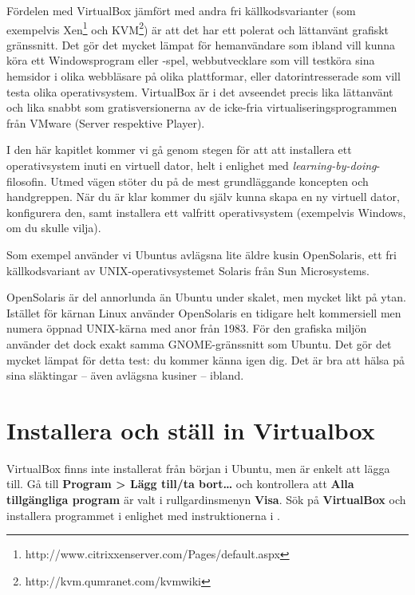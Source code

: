 \documentclass[a4paper,final]{memoir} %
\begin{document}
Fördelen med VirtualBox jämfört med andra fri källkodsvarianter (som exempelvis Xen\footnote{http://www.citrixxenserver.com/Pages/default.aspx} och KVM\footnote{http://kvm.qumranet.com/kvmwiki}) är att det har ett polerat och lättanvänt grafiskt gränssnitt. Det gör det mycket lämpat för hemanvändare som ibland vill kunna köra ett Windowsprogram eller -spel, webbutvecklare som vill testköra sina hemsidor i olika webbläsare på olika plattformar, eller datorintresserade som vill testa olika operativsystem. VirtualBox är i det avseendet precis lika lättanvänt och lika snabbt som gratisversionerna av de icke-fria virtualiseringsprogrammen från VMware (Server respektive Player). 

I den här kapitlet kommer vi gå genom stegen för att att installera ett operativsystem inuti en virtuell dator, helt i enlighet med \textit{learning-by-doing}-filosofin. Utmed vägen stöter du på de mest grundläggande koncepten och handgreppen. När du är klar kommer du själv kunna skapa en ny virtuell dator, konfigurera den, samt installera ett valfritt operativsystem (exempelvis Windows, om du skulle vilja). 

Som exempel använder vi Ubuntus avlägsna lite äldre kusin OpenSolaris, ett fri källkodsvariant av UNIX-operativsystemet Solaris från Sun Microsystems. 

OpenSolaris är del annorlunda än Ubuntu under skalet, men mycket likt på ytan. Istället för kärnan Linux använder OpenSolaris en tidigare helt kommersiell men numera öppnad UNIX-kärna med anor från 1983. För den grafiska miljön använder det dock exakt samma GNOME-gränssnitt som Ubuntu. Det gör det mycket lämpat för detta test: du kommer känna igen dig. Det är bra att hälsa på sina släktingar -- även avlägsna kusiner -- ibland. 


\section{Installera och ställ in Virtualbox}\label{sec:virtualboxinstallera}

VirtualBox finns inte installerat från början i Ubuntu, men är enkelt att lägga till. Gå till \textbf{Program \textgreater{} Lägg till/ta bort\ldots{}} och kontrollera att \textbf{Alla tillgängliga program} är valt i rullgardinsmenyn \textbf{Visa}. Sök på \textbf{VirtualBox} och installera programmet i enlighet med instruktionerna i .
\end{document}
